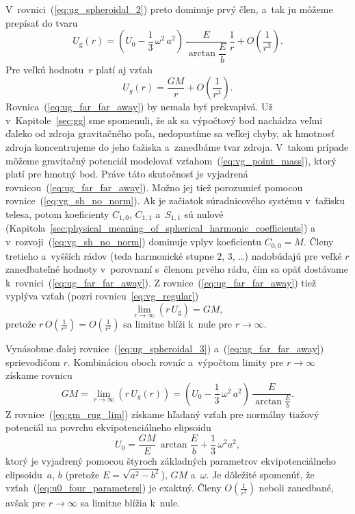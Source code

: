 \documentclass[a4paper,12pt]{book}
\newcommand{\gidx}{\mathrm g}
\begin{document}
V~rovnici~(\ref{eq:ug_spheroidal_2}) preto dominuje prvý člen, a~tak ju môžeme 
prepísať do tvaru
%
\begin{equation}
\label{eq:ug_spheroidal_3}
U_\gidx(r) = \left( U_0 - \frac{1}{3} \, \omega^2 \, a^2 \right) \, 
\frac{E}{\arctan\dfrac{E}{b}} \, \frac{1}{r} + O\left( \frac{1}{r^3} \right){.}
\end{equation}
%
Pre veľkú hodnotu~$r$ platí aj vzťah
%
\begin{equation}
\label{eq:ug_far_far_away}
U_g(r) = \frac{GM}{r} + O\left( \frac{1}{r^3}\right){.}
\end{equation}
%
Rovnica~(\ref{eq:ug_far_far_away}) by nemala byť prekvapivá.  Už 
v~Kapitole~\ref{sec:gg} sme spomenuli, že ak sa výpočtový bod nachádza veľmi 
ďaleko od zdroja gravitačného poľa, nedopustíme sa veľkej chyby, ak hmotnosť 
zdroja koncentrujeme do jeho ťažiska a~zanedbáme tvar zdroja.  V~takom prípade 
môžeme gravitačný potenciál modelovať vzťahom~(\ref{eq:vg_point_mass}), ktorý 
platí pre hmotný bod.  Práve táto skutočnosť je vyjadrená 
rovnicou~(\ref{eq:ug_far_far_away}).  Možno jej tiež porozumieť pomocou 
rovnice~(\ref{eq:vg_sh_no_norm}).  Ak je začiatok súradnicového systému 
v~ťažisku telesa, potom koeficienty $C_{1,0}$, $C_{1,1}$ a~$S_{1,1}$ sú nulové 
(Kapitola~\ref{sec:physical_meaning_of_spherical_harmonic_coefficients}) 
a v~rozvoji~(\ref{eq:vg_sh_no_norm}) dominuje vplyv koeficientu $C_{0,0} = M$.  
Členy tretieho a~vyšších rádov (teda harmonické stupne $2$, $3$, \dots) 
nadobúdajú pre veľké $r$ zanedbateľné hodnoty v~porovnaní s~členom prvého rádu, 
čím sa opäť dostávame k~rovnici~(\ref{eq:ug_far_far_away}).  
Z rovnice~(\ref{eq:ug_far_far_away}) tiež vyplýva vzťah (pozri 
rovnicu~\ref{eq:vg_regular})
%
\begin{equation}
\lim_{r \rightarrow \infty} (r \, U_\gidx) = GM{,}
\end{equation}
%
pretože $r \, O \left( \frac{1}{r^3} \right) = O\left( \frac{1}{r^2} \right)$ 
sa limitne blíži k~nule pre $r \rightarrow \infty$.

Vynásobme ďalej rovnice~(\ref{eq:ug_spheroidal_3}) a~(\ref{eq:ug_far_far_away}) 
sprievodičom $r$.  Kombináciou oboch rovníc a~výpočtom limity pre $r 
\rightarrow \infty$ získame rovnicu
%
\begin{equation}
\label{eq:gm_rug_lim}
GM = \lim_{r \rightarrow \infty} (r \, U_g(r)) = \left( U_0 - \frac{1}{3} \, 
\omega^2 \, a^2 \right) \, \frac{E}{\arctan\frac{E}{b}}{.}
\end{equation}
%
Z rovnice~(\ref{eq:gm_rug_lim}) získame hľadaný vzťah pre normálny tiažový 
potenciál na povrchu ekvipotenciálneho elipsoidu
%
\begin{equation}
\label{eq:u0_four_parameters}
U_0 = \frac{GM}{E} \, \arctan\frac{E}{b} + \frac{1}{3} \, \omega^2 a^2{,}
\end{equation}
%
ktorý je vyjadrený pomocou štyroch základných parametrov ekvipotenciálneho 
elipsoidu~$a$, $b$ (pretože $E = \sqrt{a^2 - b^2}$), $GM$ a~$\omega$.  Je 
dôležité spomenúť, že vzťah~(\ref{eq:u0_four_parameters}) je exaktný.  Členy 
$O\left( \frac{1}{r^2} \right)$ neboli zanedbané, avšak pre $r \rightarrow 
\infty$ sa limitne blížia k~nule.
\end{document}
